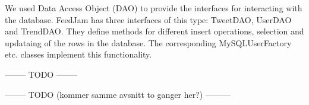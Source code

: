 
We used Data Access Object (DAO) to provide the interfaces for interacting with the database. FeedJam has three interfaces of this type: TweetDAO, UserDAO and TrendDAO. They define methods for different insert operations, selection and updataing of the rows in the database. The corresponding MySQLUserFactory etc. classes implement this functionality.



-------- TODO --------



-------- TODO (kommer samme avsnitt to ganger her?) ---------



